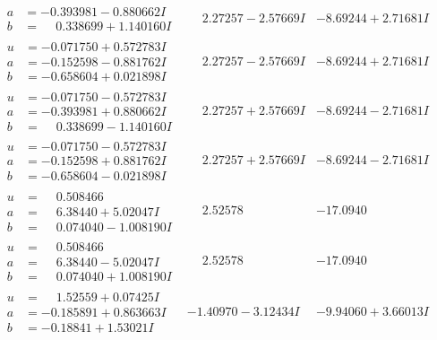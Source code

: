 \documentclass[1p]{elsarticle_modified}
\theoremstyle{definition}
\begin{document}
$$\begin{array}{c|c|c}
\begin{aligned}
a &= -0.393981 - 0.880662 I \\
b &= \phantom{-}0.338699 + 1.140160 I\end{aligned}
 & \phantom{-}2.27257 - 2.57669 I & -8.69244 + 2.71681 I \\ \hline\begin{aligned}
u &= -0.071750 + 0.572783 I \\
a &= -0.152598 - 0.881762 I \\
b &= -0.658604 + 0.021898 I\end{aligned}
 & \phantom{-}2.27257 - 2.57669 I & -8.69244 + 2.71681 I \\ \hline\begin{aligned}
u &= -0.071750 - 0.572783 I \\
a &= -0.393981 + 0.880662 I \\
b &= \phantom{-}0.338699 - 1.140160 I\end{aligned}
 & \phantom{-}2.27257 + 2.57669 I & -8.69244 - 2.71681 I \\ \hline\begin{aligned}
u &= -0.071750 - 0.572783 I \\
a &= -0.152598 + 0.881762 I \\
b &= -0.658604 - 0.021898 I\end{aligned}
 & \phantom{-}2.27257 + 2.57669 I & -8.69244 - 2.71681 I \\ \hline\begin{aligned}
u &= \phantom{-}0.508466\phantom{ +0.000000I} \\
a &= \phantom{-}6.38440 + 5.02047 I \\
b &= \phantom{-}0.074040 - 1.008190 I\end{aligned}
 & \phantom{-}2.52578\phantom{ +0.000000I} & -17.0940\phantom{ +0.000000I} \\ \hline\begin{aligned}
u &= \phantom{-}0.508466\phantom{ +0.000000I} \\
a &= \phantom{-}6.38440 - 5.02047 I \\
b &= \phantom{-}0.074040 + 1.008190 I\end{aligned}
 & \phantom{-}2.52578\phantom{ +0.000000I} & -17.0940\phantom{ +0.000000I} \\ \hline\begin{aligned}
u &= \phantom{-}1.52559 + 0.07425 I \\
a &= -0.185891 + 0.863663 I \\
b &= -0.18841 + 1.53021 I\end{aligned}
 & -1.40970 - 3.12434 I & -9.94060 + 3.66013 I \\ \hline\begin{aligned}

\end{aligned}
\end{array}$$
\end{document}
